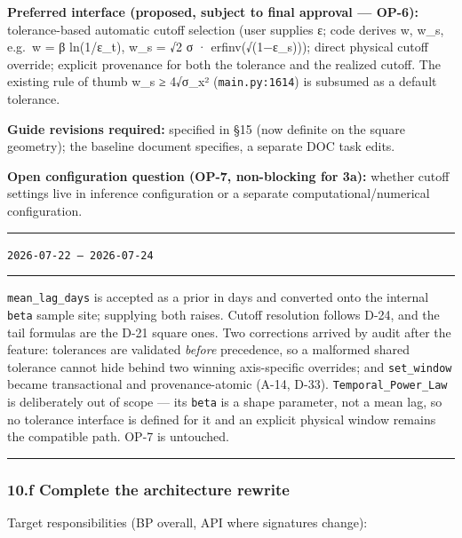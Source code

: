 \documentclass[
  10pt,
]{article}
\newenvironment{amendment}[2]{%
  \par\medskip\noindent
  {\color{amdcolor}\rule{\linewidth}{1pt}}\par\nobreak
  \vspace{-0.45\baselineskip}
  \noindent{\color{amdcolor}\textbf{#1}}\hfill{\color{amdcolor}\small\texttt{#2}}\par\nobreak
  \vspace{-0.35\baselineskip}
  {\color{amdcolor}\rule{\linewidth}{0.4pt}}\par\nobreak\smallskip
}{%
  \par\nobreak\vspace{-0.25\baselineskip}
  {\color{amdcolor}\rule{\linewidth}{1pt}}\par\medskip
}
\begin{document}
\textbf{Preferred interface (proposed, subject to final approval --- OP-6):} tolerance-based automatic cutoff selection (user supplies ε; code derives w, w\_s, e.g.~w = β ln(1/ε\_t), w\_s = √2 σ · erfinv(√(1−ε\_s))); direct physical cutoff override; explicit provenance for both the tolerance and the realized cutoff. The existing rule of thumb w\_s ≥ 4√σ\_x² (\texttt{main.py:1614}) is subsumed as a default tolerance.

\textbf{Guide revisions required:} specified in §15 (now definite on the square geometry); the baseline document specifies, a separate DOC task edits.

\textbf{Open configuration question (OP-7, non-blocking for 3a):} whether cutoff settings live in inference configuration or a separate computational/numerical configuration.

\begin{amendment}{A-13 --- 10.e as implemented}{2026-07-22 -- 2026-07-24}
\texttt{mean\_lag\_days} is accepted as a prior in days and converted onto the internal \texttt{beta} sample site; supplying both raises. Cutoff resolution follows D-24, and the tail formulas are the D-21 square ones. Two corrections arrived by audit after the feature: tolerances are validated \emph{before} precedence, so a malformed shared tolerance cannot hide behind two winning axis-specific overrides; and \texttt{set\_window} became transactional and provenance-atomic (A-14, D-33). \texttt{Temporal\_Power\_Law} is deliberately out of scope --- its \texttt{beta} is a shape parameter, not a mean lag, so no tolerance interface is defined for it and an explicit physical window remains the compatible path. OP-7 is untouched.
\end{amendment}

\hypertarget{f-complete-the-architecture-rewrite}{%
\subsubsection{10.f Complete the architecture rewrite}\label{f-complete-the-architecture-rewrite}}

Target responsibilities (BP overall, API where signatures change):
\end{document}

